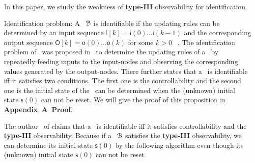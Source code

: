 In this paper, we study the weakness of {\bf type-III} observability for identification.

Identification problem: A \BCN\ ${\mathcal{B}}$ is identifiable if the updating rules can be determined by an input sequence $\mathsf{I}[k]=\mathsf{i}(0)\ldots\mathsf{i}(k-1)$ and the corresponding output sequence $\mathsf{O}[k]=\mathsf{o}(0)\ldots\mathsf{o}(k)$ for some $k>0$~ \cite{Cheng2011Identification}. The identification problem of \BCNs\ was proposed in~\cite{Cheng2011Identification} to determine the updating rules of a \BCN\ by repeatedly feeding inputs to the input-nodes and observing the corresponding values generated by the output-nodes. 
There further states that a \BCN\ is identifiable iff it satisfies two conditions. The first one is the controllability and the second one is the initial state of the \BCN\ can be determined when the  (unknown) initial state $\mathsf{s}(0)$ can not be reset. We will give the proof of this proposition in {\bf Appendix~A~Proof}. %

The author~\cite{Cheng2011Identification} of claims that a \BCN\ is identifiable iff it satisfies controllability and the {\bf type-III} observability. Because if a \BCN\ ${\mathcal{B}}$ satisfies the {\bf type-III} observability, we can determine its initial state $\mathsf{s}(0)$ by the following algorithm even though its (unknown) initial state $\mathsf{s}(0)$ can not be reset.




 
 


